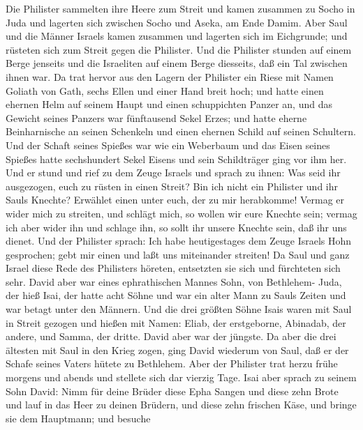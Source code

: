  Die Philister sammelten ihre Heere zum Streit und kamen
zusammen zu Socho in Juda und lagerten sich zwischen Socho und Aseka, am
Ende Damim.  Aber Saul und die Männer Israels kamen zusammen
und lagerten sich im Eichgrunde; und rüsteten sich zum Streit gegen die
Philister.  Und die Philister stunden auf einem Berge
jenseits und die Israeliten auf einem Berge diesseits, daß ein Tal
zwischen ihnen war.  Da trat hervor aus den Lagern der
Philister ein Riese mit Namen Goliath von Gath, sechs Ellen und einer
Hand breit hoch;  und hatte einen ehernen Helm auf seinem
Haupt und einen schuppichten Panzer an, und das Gewicht seines Panzers
war fünftausend Sekel Erzes;  und hatte eherne Beinharnische
an seinen Schenkeln und einen ehernen Schild auf seinen Schultern.
 Und der Schaft seines Spießes war wie ein Weberbaum und das
Eisen seines Spießes hatte sechshundert Sekel Eisens und sein
Schildträger ging vor ihm her.  Und er stund und rief zu dem
Zeuge Israels und sprach zu ihnen: Was seid ihr ausgezogen, euch zu
rüsten in einen Streit? Bin ich nicht ein Philister und ihr Sauls
Knechte? Erwählet einen unter euch, der zu mir herabkomme! 
Vermag er wider mich zu streiten, und schlägt mich, so wollen wir eure
Knechte sein; vermag ich aber wider ihn und schlage ihn, so sollt ihr
unsere Knechte sein, daß ihr uns dienet.  Und der Philister
sprach: Ich habe heutigestages dem Zeuge Israels Hohn gesprochen; gebt
mir einen und laßt uns miteinander streiten!  Da Saul und
ganz Israel diese Rede des Philisters höreten, entsetzten sie sich und
fürchteten sich sehr.  David aber war eines ephrathischen
Mannes Sohn, von Bethlehem- Juda, der hieß Isai, der hatte acht Söhne
und war ein alter Mann zu Sauls Zeiten und war betagt unter den Männern.
 Und die drei größten Söhne Isais waren mit Saul in Streit
gezogen und hießen mit Namen: Eliab, der erstgeborne, Abinadab, der
andere, und Samma, der dritte.  David aber war der jüngste.
Da aber die drei ältesten mit Saul in den Krieg zogen, 
ging David wiederum von Saul, daß er der Schafe seines Vaters hütete zu
Bethlehem.  Aber der Philister trat herzu frühe morgens und
abends und stellete sich dar vierzig Tage.  Isai aber
sprach zu seinem Sohn David: Nimm für deine Brüder diese Epha Sangen und
diese zehn Brote und lauf in das Heer zu deinen Brüdern, 
und diese zehn frischen Käse, und bringe sie dem Hauptmann; und besuche
